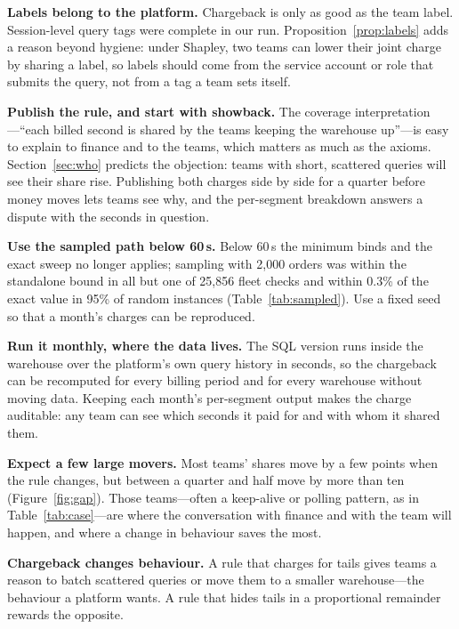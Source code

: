 \documentclass[sigconf]{acmart}
\begin{document}
\textbf{Labels belong to the platform.} Chargeback is only as good as the team label. Session-level query tags were complete
in our run. Proposition~\ref{prop:labels} adds a reason beyond hygiene: under Shapley, two teams can lower their joint
charge by sharing a label, so labels should come from the service account or role that submits the query, not from a tag a
team sets itself.

\textbf{Publish the rule, and start with showback.} The coverage interpretation---``each billed second is shared by the
teams keeping the warehouse up''---is easy to explain to finance and to the teams, which matters as much as the axioms.
Section~\ref{sec:who} predicts the objection: teams with short, scattered queries will see their share rise. Publishing both
charges side by side for a quarter before money moves lets teams see why, and the per-segment breakdown answers a dispute
with the seconds in question.

\textbf{Use the sampled path below 60\,s.} Below 60\,s the minimum binds and the exact sweep no longer applies; sampling
with 2,000 orders was within the standalone bound in all but one of 25,856 fleet checks and within 0.3\% of the exact value
in 95\% of random instances (Table~\ref{tab:sampled}). Use a fixed seed so that a month's charges can be reproduced.

\textbf{Run it monthly, where the data lives.} The SQL version runs inside the warehouse over the platform's own query
history in seconds, so the chargeback can be recomputed for every billing period and for every warehouse without moving
data. Keeping each month's per-segment output makes the charge auditable: any team can see which seconds it paid for and
with whom it shared them.

\textbf{Expect a few large movers.} Most teams' shares move by a few points when the rule changes, but between a quarter and
half move by more than ten (Figure~\ref{fig:gap}). Those teams---often a keep-alive or polling pattern, as in Table~\ref{tab:case}---are
where the conversation with finance and with the team will happen, and where a change in behaviour saves the most.

\textbf{Chargeback changes behaviour.} A rule that charges for tails gives teams a reason to batch scattered queries or move
them to a smaller warehouse---the behaviour a platform wants. A rule that hides tails in a proportional remainder rewards
the opposite.
\end{document}
